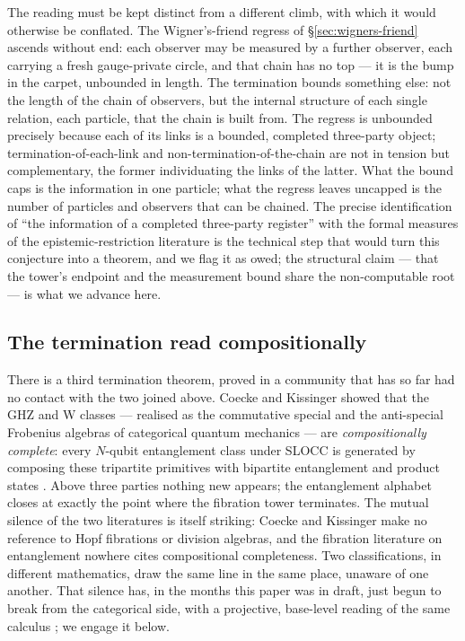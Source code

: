 The reading must be kept distinct from a different climb, with which it would otherwise be
conflated. The Wigner's-friend regress of \S\ref{sec:wigners-friend} ascends without end: each
observer may be measured by a further observer, each carrying a fresh gauge-private circle, and
that chain has no top --- it is the bump in the carpet, unbounded in length. The termination
bounds something else: not the length of the chain of observers, but the internal structure of
each single relation, each particle, that the chain is built from. The regress is unbounded
precisely because each of its links is a bounded, completed three-party object;
termination-of-each-link and non-termination-of-the-chain are not in tension but complementary,
the former individuating the links of the latter. What the bound caps is the information in one
particle; what the regress leaves uncapped is the number of particles and observers that can be
chained. The precise identification of ``the information of a completed three-party register''
with the formal measures of the epistemic-restriction literature is the technical step that
would turn this conjecture into a theorem, and we flag it as owed; the structural claim --- that
the tower's endpoint and the measurement bound share the non-computable root --- is what we
advance here.

\subsection{The termination read compositionally}
\label{sec:hopf-compositional}

There is a third termination theorem, proved in a community that has so far had no contact with
the two joined above. Coecke and Kissinger showed that the GHZ and W classes --- realised as the
commutative special and the anti-special Frobenius algebras of categorical quantum mechanics ---
are \emph{compositionally complete}: every $N$-qubit entanglement class under SLOCC is generated
by composing these tripartite primitives with bipartite entanglement and product states
\autocite{coeckekissinger2010compositional}. Above three parties nothing new appears; the
entanglement alphabet closes at exactly the point where the fibration tower terminates. The
mutual silence of the two literatures is itself striking: Coecke and Kissinger make no reference
to Hopf fibrations or division algebras, and the fibration literature on entanglement
\autocite{mosseri2001hopf,bernevigchen2003geometry} nowhere cites compositional completeness.
Two classifications, in different mathematics, draw the same line in the same place, unaware of
one another. That silence has, in the months this paper was in draft, just begun to break from
the categorical side, with a projective, base-level reading of the same calculus
\autocite{burtonanwar2026meromorphic}; we engage it below.

